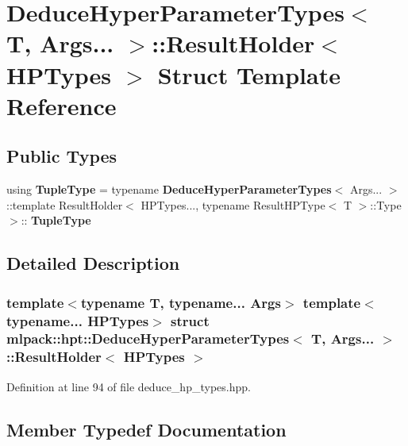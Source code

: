 \section{Deduce\+Hyper\+Parameter\+Types$<$ T, Args... $>$\+:\+:Result\+Holder$<$ H\+P\+Types $>$ Struct Template Reference}
\label{structmlpack_1_1hpt_1_1DeduceHyperParameterTypes_3_01T_00_01Args_8_8_8_01_4_1_1ResultHolder}
\subsection*{Public Types}
\begin{DoxyCompactItemize}
\item 
using \textbf{ Tuple\+Type} = typename \textbf{ Deduce\+Hyper\+Parameter\+Types}$<$ Args... $>$\+::template Result\+Holder$<$ H\+P\+Types..., typename Result\+H\+P\+Type$<$ T $>$\+::Type $>$\+::\textbf{ Tuple\+Type}
\end{DoxyCompactItemize}


\subsection{Detailed Description}
\subsubsection*{template$<$typename T, typename... Args$>$\newline
template$<$typename... H\+P\+Types$>$\newline
struct mlpack\+::hpt\+::\+Deduce\+Hyper\+Parameter\+Types$<$ T, Args... $>$\+::\+Result\+Holder$<$ H\+P\+Types $>$}



Definition at line 94 of file deduce\+\_\+hp\+\_\+types.\+hpp.



\subsection{Member Typedef Documentation}
\mbox{\label{structmlpack_1_1hpt_1_1DeduceHyperParameterTypes_3_01T_00_01Args_8_8_8_01_4_1_1ResultHolder_a2f1706932f0f0a3ac0f4da29b7672abf}} 
